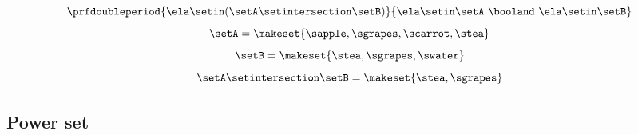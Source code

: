 \begin{forslides}
\begin{equation}
\prfdoubleperiod{ \ela \setin(\setA \setintersection \setB)}{\ela \setin\setA \ \booland\ \ela \setin\setB}
\end{equation}
 \begin{equation}\label{slides_session2_13}
\setA = \makeset{ \sapple, \sgrapes, \scarrot, \stea }
\end{equation}
\begin{equation}\label{slides_session2_14}
\setB = \makeset{ \stea, \sgrapes, \swater }
\end{equation}
 \begin{equation}\label{slides_session2_15}
\setA \setintersection \setB = \makeset{ \stea, \sgrapes }
\end{equation}

\subsection{Power set}


\end{forslides}
